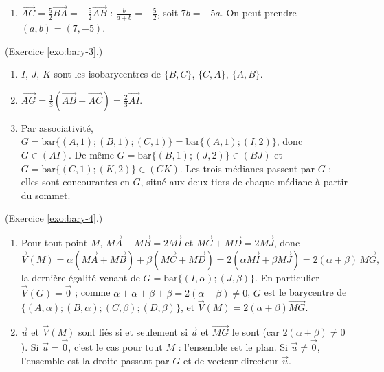 \begin{corrige}
\begin{sol}
\begin{enumerate}
\item $\overrightarrow{AC} = \frac{5}{2}\overrightarrow{BA} = -\frac{5}{2}\overrightarrow{AB}$ : $\frac{b}{a+b} = -\frac{5}{2}$, soit $7b = -5a$.
      On peut prendre $(a,b) = (7,-5)$.
\end{enumerate}
\end{sol}
%
\begin{sol} (Exercice \ref{exo:bary-3}.)
\begin{enumerate}
\item $I$, $J$, $K$ sont les isobarycentres de $\{B,C\}$, $\{C,A\}$, $\{A,B\}$.
\item $\overrightarrow{AG} = \frac{1}{3}\left(\overrightarrow{AB} + \overrightarrow{AC}\right) = \frac{2}{3}\overrightarrow{AI}$.
\item Par associativit\'e, $G = \mathrm{bar}\{(A,1);(B,1);(C,1)\} = \mathrm{bar}\{(A,1);(I,2)\}$, donc $G \in (AI)$.
      De m\^eme $G = \mathrm{bar}\{(B,1);(J,2)\}\in(BJ)$ et $G = \mathrm{bar}\{(C,1);(K,2)\}\in(CK)$.
      Les trois m\'edianes passent par $G$ : elles sont concourantes en $G$, situ\'e aux deux tiers de chaque m\'ediane \`a partir du sommet.
\end{enumerate}
\end{sol}
%
\begin{sol} (Exercice \ref{exo:bary-4}.)
\begin{enumerate}
\item Pour tout point $M$, $\overrightarrow{MA} + \overrightarrow{MB} = 2\overrightarrow{MI}$ et $\overrightarrow{MC} + \overrightarrow{MD} = 2\overrightarrow{MJ}$, donc
      \[
      \vec{V}(M) = \alpha\left(\overrightarrow{MA} + \overrightarrow{MB}\right) + \beta\left(\overrightarrow{MC} + \overrightarrow{MD}\right)
      = 2\left(\alpha\overrightarrow{MI} + \beta\overrightarrow{MJ}\right) = 2(\alpha+\beta)\,\overrightarrow{MG},
      \]
      la derni\`ere \'egalit\'e venant de $G = \mathrm{bar}\{(I,\alpha);(J,\beta)\}$.
      En particulier $\vec{V}(G) = \vec{0}$ ; comme $\alpha+\alpha+\beta+\beta = 2(\alpha+\beta) \neq 0$, $G$ est le barycentre de
      $\{(A,\alpha);(B,\alpha);(C,\beta);(D,\beta)\}$, et $\vec{V}(M) = 2(\alpha+\beta)\overrightarrow{MG}$.
\item $\vec{u}$ et $\vec{V}(M)$ sont li\'es si et seulement si $\vec{u}$ et $\overrightarrow{MG}$ le sont (car $2(\alpha+\beta)\neq 0$).
      Si $\vec{u} = \vec{0}$, c'est le cas pour tout $M$ : l'ensemble est le plan.
      Si $\vec{u}\neq\vec{0}$, l'ensemble est la droite passant par $G$ et de vecteur directeur $\vec{u}$.
\end{enumerate}

\end{sol}
\end{corrige}
